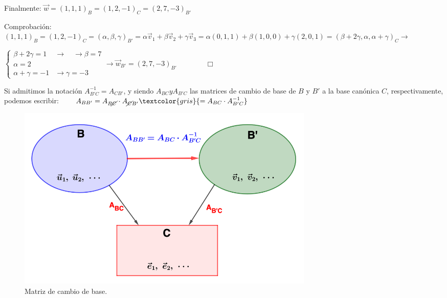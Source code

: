 \begin{proofw}
\noindent Finalmente: $\vec w= (1,1,1)_B=(1,2,-1)_C=(2,7,-3)_{B'}$

\noindent \textcolor{gris}{Comprobación: $(1,1,1)_B=(1,2,-1)_C=(\alpha, \beta, \gamma)_{B'}=\alpha \vec v_1 + \beta \vec v_2 + \gamma \vec v_3 = \alpha (0,1,1)+\beta(1,0,0)+\gamma (2,0,1)=(\beta+2\gamma, \alpha, \alpha+\gamma)_C \to $}

\noindent \textcolor{gris}{$\begin{cases} \beta+2\gamma =1 & \to \quad \to \beta =7\\
 \alpha = 2\\
 \alpha + \gamma =-1 & \to \gamma =-3 \end{cases}  \to \vec w_{B'}=(2,7,-3)_{B'}\qquad \qquad  \Box$}	
 
 Si admitimos la notación $A^{-1}_{B'C}=A_{CB'}$, y siendo $A_{BC} y A_{B'C}$ las matrices de cambio de base de $B$ y $B'$ a la base canónica $C$, respectivamente, podemos escribir:
 $\qquad A_{BB'}=A_{B\cancel{C}}\cdot A_{\cancel{C}B'} \textcolor{gris}{= A_{BC}\cdot A^{-1}_{B'C}}$

\end{proofw}

\begin{figure}[H]
	\centering
	\includegraphics[width=0.7\textwidth]{imagenes/imagenes06/T06IM01.png}
		\caption*{Matriz de cambio de base.}
\end{figure}


